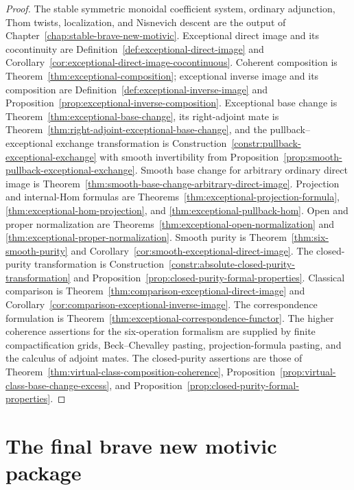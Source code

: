 \begin{proof}
The stable symmetric monoidal coefficient system, ordinary adjunction,
Thom twists, localization, and Nisnevich descent are the output of
Chapter~\ref{chap:stable-brave-new-motivic}.  Exceptional direct image and
its cocontinuity are Definition~\ref{def:exceptional-direct-image} and
Corollary~\ref{cor:exceptional-direct-image-cocontinuous}.  Coherent
composition is Theorem~\ref{thm:exceptional-composition}; exceptional
inverse image and its composition are
Definition~\ref{def:exceptional-inverse-image} and
Proposition~\ref{prop:exceptional-inverse-composition}.  Exceptional base
change is Theorem~\ref{thm:exceptional-base-change}, its right-adjoint mate
is Theorem~\ref{thm:right-adjoint-exceptional-base-change}, and the
pullback--exceptional exchange transformation is
Construction~\ref{constr:pullback-exceptional-exchange} with smooth
invertibility from
Proposition~\ref{prop:smooth-pullback-exceptional-exchange}.  Smooth base
change for arbitrary ordinary direct image is
Theorem~\ref{thm:smooth-base-change-arbitrary-direct-image}.  Projection
and internal-Hom formulas are
Theorems~\ref{thm:exceptional-projection-formula},
\ref{thm:exceptional-hom-projection}, and
\ref{thm:exceptional-pullback-hom}.  Open and proper normalization are
Theorems~\ref{thm:exceptional-open-normalization} and
\ref{thm:exceptional-proper-normalization}.  Smooth purity is
Theorem~\ref{thm:six-smooth-purity} and
Corollary~\ref{cor:smooth-exceptional-direct-image}.  The closed-purity
transformation is
Construction~\ref{constr:absolute-closed-purity-transformation} and
Proposition~\ref{prop:closed-purity-formal-properties}.  Classical
comparison is
Theorem~\ref{thm:comparison-exceptional-direct-image} and
Corollary~\ref{cor:comparison-exceptional-inverse-image}.  The
correspondence formulation is
Theorem~\ref{thm:exceptional-correspondence-functor}.  The higher coherence
assertions for the six-operation formalism are supplied by finite
compactification grids, Beck--Chevalley pasting, projection-formula pasting,
and the calculus of adjoint mates.  The closed-purity assertions are those
of
Theorem~\ref{thm:virtual-class-composition-coherence},
Proposition~\ref{prop:virtual-class-base-change-excess}, and
Proposition~\ref{prop:closed-purity-formal-properties}.
\end{proof}

\section{The final brave new motivic package}
\label{sec:final-brave-new-motivic-package}

